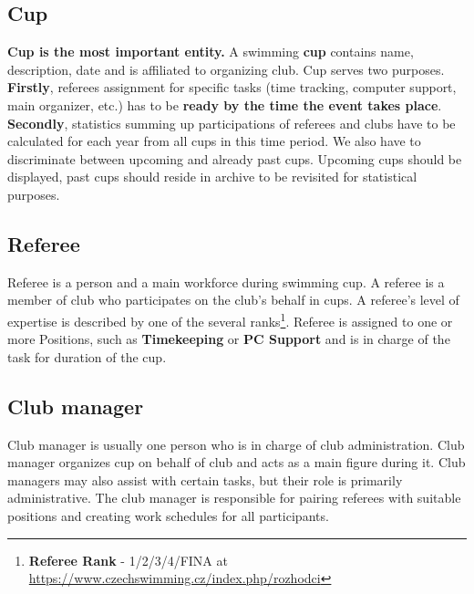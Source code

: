 \subsection*{Cup}
\textbf{Cup is the most important entity.} A swimming \textbf{cup} contains name, description, date and is affiliated to organizing club. Cup serves two purposes. \textbf{Firstly}, referees assignment for specific tasks (time tracking, computer support, main organizer, etc.) has to be \textbf{ready by the time the event takes place}. \textbf{Secondly}, statistics summing up participations of referees and clubs have to be calculated for each year from all cups in this time period. We also have to discriminate between upcoming and already past cups. Upcoming cups should be displayed, past cups should reside in archive to be revisited for statistical purposes.

\subsection*{Referee}
Referee is a person and a main workforce during swimming cup. A referee is a member of club who participates on the club's behalf in cups. A referee's level of expertise is described by one of the several ranks\footnote{\textbf{Referee Rank} - 1/2/3/4/FINA at \url{https://www.czechswimming.cz/index.php/rozhodci}}. Referee is assigned to one or more Positions, such as \textbf{Timekeeping} or \textbf{PC Support} and is in charge of the task for duration of the cup. 
\subsection*{Club manager}
Club manager is usually one person who is in charge of club administration. Club manager organizes cup on behalf of club and acts as a main figure during it. Club managers may also assist with certain tasks, but their role is primarily administrative. The club manager is responsible for pairing referees with suitable positions and creating work schedules for all participants.
